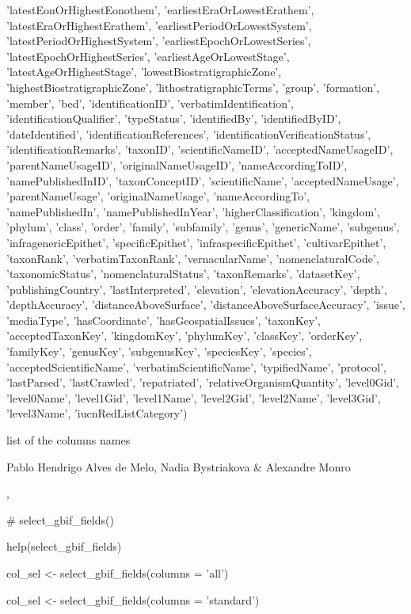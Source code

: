 \documentclass[a4paper]{book}
\begin{document}
\begin{Details}
'latestEonOrHighestEonothem',
'earliestEraOrLowestErathem',
'latestEraOrHighestErathem',
'earliestPeriodOrLowestSystem',
'latestPeriodOrHighestSystem',
'earliestEpochOrLowestSeries',
'latestEpochOrHighestSeries',
'earliestAgeOrLowestStage',
'latestAgeOrHighestStage',
'lowestBiostratigraphicZone',
'highestBiostratigraphicZone',
'lithostratigraphicTerms',
'group',
'formation',
'member',
'bed',
'identificationID',
'verbatimIdentification',
'identificationQualifier',
'typeStatus',
'identifiedBy',
'identifiedByID',
'dateIdentified',
'identificationReferences',
'identificationVerificationStatus',
'identificationRemarks',
'taxonID',
'scientificNameID',
'acceptedNameUsageID',
'parentNameUsageID',
'originalNameUsageID',
'nameAccordingToID',
'namePublishedInID',
'taxonConceptID',
'scientificName',
'acceptedNameUsage',
'parentNameUsage',
'originalNameUsage',
'nameAccordingTo',
'namePublishedIn',
'namePublishedInYear',
'higherClassification',
'kingdom',
'phylum',
'class',
'order',
'family',
'subfamily',
'genus',
'genericName',
'subgenus',
'infragenericEpithet',
'specificEpithet',
'infraspecificEpithet',
'cultivarEpithet',
'taxonRank',
'verbatimTaxonRank',
'vernacularName',
'nomenclaturalCode',
'taxonomicStatus',
'nomenclaturalStatus',
'taxonRemarks',
'datasetKey',
'publishingCountry',
'lastInterpreted',
'elevation',
'elevationAccuracy',
'depth',
'depthAccuracy',
'distanceAboveSurface',
'distanceAboveSurfaceAccuracy',
'issue',
'mediaType',
'hasCoordinate',
'hasGeospatialIssues',
'taxonKey',
'acceptedTaxonKey',
'kingdomKey',
'phylumKey',
'classKey',
'orderKey',
'familyKey',
'genusKey',
'subgenusKey',
'speciesKey',
'species',
'acceptedScientificName',
'verbatimScientificName',
'typifiedName',
'protocol',
'lastParsed',
'lastCrawled',
'repatriated',
'relativeOrganismQuantity',
'level0Gid',
'level0Name',
'level1Gid',
'level1Name',
'level2Gid',
'level2Name',
'level3Gid',
'level3Name',
'iucnRedListCategory')
\end{Details}
%
\begin{Value}
list of the columns names
\end{Value}
%
\begin{Author}
Pablo Hendrigo Alves de Melo,
Nadia Bystriakova \&
Alexandre Monro
\end{Author}
%
\begin{SeeAlso}
, 
\end{SeeAlso}
%
\begin{Examples}
\begin{ExampleCode}

# select_gbif_fields()

help(select_gbif_fields)

col_sel <- select_gbif_fields(columns = 'all')

col_sel <- select_gbif_fields(columns = 'standard')


\end{ExampleCode}
\end{Examples}
\end{document}
